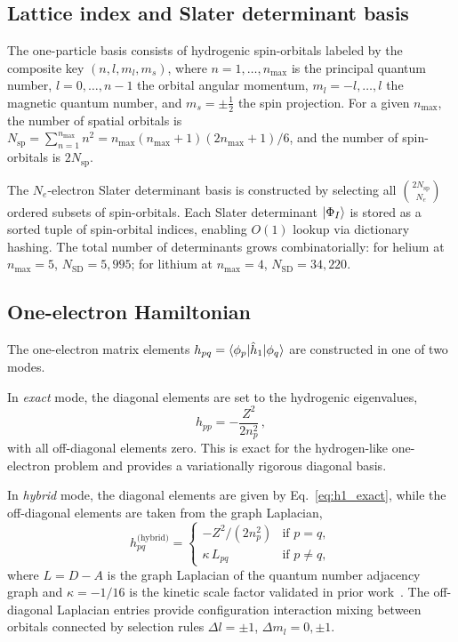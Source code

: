 \documentclass[aps,pra,twocolumn,superscriptaddress,longbibliography,floatfix]{revtex4-2}
\begin{document}
\subsection{Lattice index and Slater determinant basis}
\label{sec:lattice_index}

The one-particle basis consists of hydrogenic spin-orbitals labeled
by the composite key $(n, l, m_l, m_s)$, where $n = 1, \ldots, n_{\max}$
is the principal quantum number, $l = 0, \ldots, n-1$ the orbital
angular momentum, $m_l = -l, \ldots, l$ the magnetic quantum number,
and $m_s = \pm\tfrac{1}{2}$ the spin projection.
For a given $n_{\max}$, the number of spatial orbitals is
$N_{\text{sp}} = \sum_{n=1}^{n_{\max}} n^2 = n_{\max}(n_{\max}+1)(2n_{\max}+1)/6$,
and the number of spin-orbitals is $2N_{\text{sp}}$.

The $N_e$-electron Slater determinant basis is constructed by
selecting all $\binom{2N_{\text{sp}}}{N_e}$ ordered subsets of
spin-orbitals.
Each Slater determinant $\ket{\Phi_I}$ is stored as a sorted tuple
of spin-orbital indices, enabling $O(1)$ lookup via dictionary hashing.
The total number of determinants grows combinatorially:
for helium at $n_{\max}=5$, $N_{\text{SD}} = 5{,}995$;
for lithium at $n_{\max}=4$, $N_{\text{SD}} = 34{,}220$.

\subsection{One-electron Hamiltonian}
\label{sec:one_electron}

The one-electron matrix elements
$h_{pq} = \braket{\phi_p | \hat{h}_1 | \phi_q}$
are constructed in one of two modes.

In \emph{exact} mode, the diagonal elements are set to the
hydrogenic eigenvalues,
\begin{equation}
h_{pp} = -\frac{Z^2}{2n_p^2}\,,
\label{eq:h1_exact}
\end{equation}
with all off-diagonal elements zero.
This is exact for the hydrogen-like one-electron problem and provides
a variationally rigorous diagonal basis.

In \emph{hybrid} mode, the diagonal elements are given by
Eq.~\eqref{eq:h1_exact}, while the off-diagonal elements are
taken from the graph Laplacian,
\begin{equation}
h_{pq}^{\text{(hybrid)}} =
\begin{cases}
-Z^2/(2n_p^2) & \text{if } p = q, \\
\kappa \, L_{pq} & \text{if } p \neq q,
\end{cases}
\label{eq:h1_hybrid}
\end{equation}
where $L = D - A$ is the graph Laplacian of the quantum number
adjacency graph and $\kappa = -1/16$ is the kinetic scale
factor validated in prior work~\cite{Loutey2026a}.
The off-diagonal Laplacian entries provide configuration interaction
mixing between orbitals connected by selection rules
$\Delta l = \pm 1$, $\Delta m_l = 0, \pm 1$.
\end{document}

